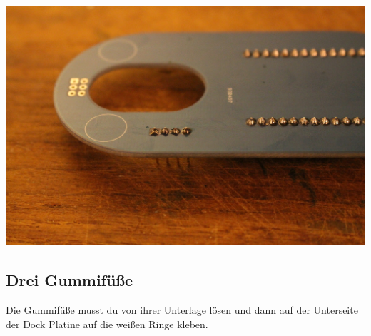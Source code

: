 \documentclass{article}
\begin{document}
\begin{minipage}[b]{0.5\textwidth}
	\includegraphics[width=\textwidth]{Bilder2019/IMG_6477.JPG}
\end{minipage}

\subsection{Drei Gummifüße}

Die Gummifüße musst du von ihrer Unterlage lösen und dann auf der Unterseite der Dock Platine auf die weißen Ringe kleben.

\vspace{1cm}
\end{document}
